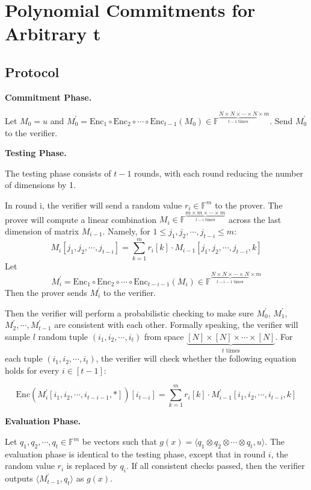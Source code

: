 \section{Polynomial Commitments for Arbitrary t}

\subsection{Protocol}

\textbf{Commitment Phase.}

Let $M_0 = u$ and $ M_0^{\prime} = \text{Enc}_1 \circ \text{Enc}_2 \circ \cdots \circ \text{Enc}_{t-1} (M_0) \in \mathbb{F}^{\underbrace{N \times N \times \cdots \times N}_{t-1 \text{ times}} \times m}$. Send $M_0^{\prime}$ to the verifier.

\textbf{Testing Phase.}

The testing phase consists of $t-1$ rounds, with each round reducing the number of dimensions by 1.

In round i, the verifier will send a random value $r_i \in \mathbb{F}^m$ to the prover.
The prover will compute a linear combination $M_i \in \mathbb{F}^{\underbrace{m \times m \times \cdots \times m}_{t-i \text{ times}}}$ across the last dimension of matrix $M_{i-1}$.
Namely, for $1 \le j_1,j_2, \cdots, j_{t-i} \le m$:
$$M_i[j_1,j_2, \cdots, j_{t-i}] = \sum_{k=1}^{m} r_{i}[k] \cdot M_{i-1}[j_1,j_2, \cdots, j_{t-i}, k]$$
Let 
$$
M_i^\prime = \text{Enc}_1 \circ \text{Enc}_2 \circ \cdots \circ \text{Enc}_{t - i - 1}(M_i)\in \mathbb{F}^{\underbrace{N \times N \times \cdots \times N}_{t-i-1 \text{ times}} \times m}
$$
Then the prover sends $M_i^\prime$ to the verifier.

Then the verifier will perform a probabilistic checking to make sure 
$M_0^\prime$, $M_1^\prime$, $M_2^\prime, \cdots, M_{t-1}^\prime$ 
are consistent with each other. Formally speaking, the verifier will sample $l$ random tuple $(i_1, i_2, \cdots, i_t)$ from space $\underbrace{[N] \times [N] \times \cdots \times [N]}_{t \text{ times}}$. 
For each tuple $(i_1, i_2, \cdots, i_t)$,
the verifier will check whether the following equation holds for every $i \in [t-1]$:

$$
    \text{Enc}(M_i^\prime[i_1, i_2, \cdots, i_{t-i-1}, *])[i_{t-i}] = \sum_{k=1}^m r_i[k] \cdot M_{i-1}^{\prime}[i_1,i_2, \cdots, i_{t-i},k]
$$

\textbf{Evaluation Phase.}

Let $q_1, q_2, \cdots, q_t \in \mathbb{F}^{m}$ be vectors such that $g(x) =\langle q_1 \otimes q_2 \otimes \cdots \otimes q_t, u \rangle $. The evaluation phase is identical to the testing phase, except that in round $i$, the random value $r_i$ is replaced by $q_i$. If all consistent checks passed, then the verifier outputs $\langle M_{t-1}^{\prime}, q_t \rangle$ as $g(x)$.

